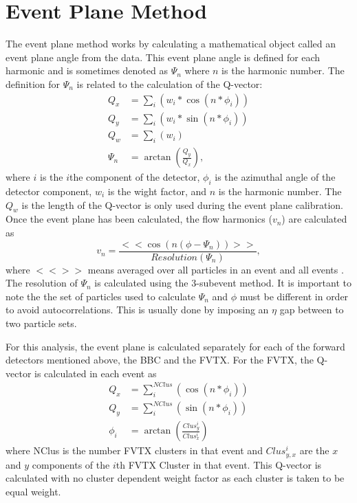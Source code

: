 \section{Event Plane Method}
The event plane method works by calculating a mathematical object called an event plane angle from the data. This event plane angle is defined for each harmonic and is sometimes denoted as $\Psi_n$ where $n$ is the harmonic number. The definition for $\Psi_n$ is related to the calculation of the Q-vector:
\begin{align}
Q_x &= \sum_i( w_i * \cos(n * \phi_i)) \\
Q_y &= \sum_i( w_i * \sin(n * \phi_i)) \\
Q_w &= \sum_i( w_i ) \\
\Psi_n &= \arctan( \frac{Q_y}{Q_x} ),
\label{eqn:general_ep_math}
\end{align}
where $i$ is the $i$the component of the detector, $\phi_i$ is the azimuthal angle of the detector component, $w_i$ is the wight factor, and $n$ is the harmonic number.
The $Q_w$ is the length of the Q-vector is only used during the event plane calibration.
Once the event plane has been calculated, the flow harmonics ($v_n$) are calculated as
\begin{equation}
v_n = \frac{<<\cos(n(\phi - \Psi_n))>>}{Resolution(\Psi_n)},
\end{equation}
where $<<>>$ means averaged over all particles in an event and all events \cite{PhysRevC.58.1671}. The resolution of $\Psi_n$ is calculated using the 3-subevent method. It is important to note the the set of particles used to calculate $\Psi_n$ and $\phi$ must be different in order to avoid
autocorrelations. This is usually done by imposing an $\eta$ gap between to two particle sets.

For this analysis, the event plane is calculated separately for each of the forward detectors mentioned above, the BBC and the FVTX.  For the FVTX, the Q-vector is calculated in each event as
\begin{align}
Q_x &= \sum^{NClus}_i( \cos(n * \phi_i)) \\
Q_y &= \sum^{NClus}_i( \sin(n * \phi_i)) \\
\phi_i &= \arctan(\frac{Clus_{y}^i}{Clus_{x}^i})
\end{align}
where NClus is the number FVTX clusters in that event and $Clus_{y,x}^i$ are the $x$ and $y$ components of the $i$th FVTX Cluster in that event. This Q-vector is calculated with no cluster dependent weight factor as each cluster is taken to be equal weight.

